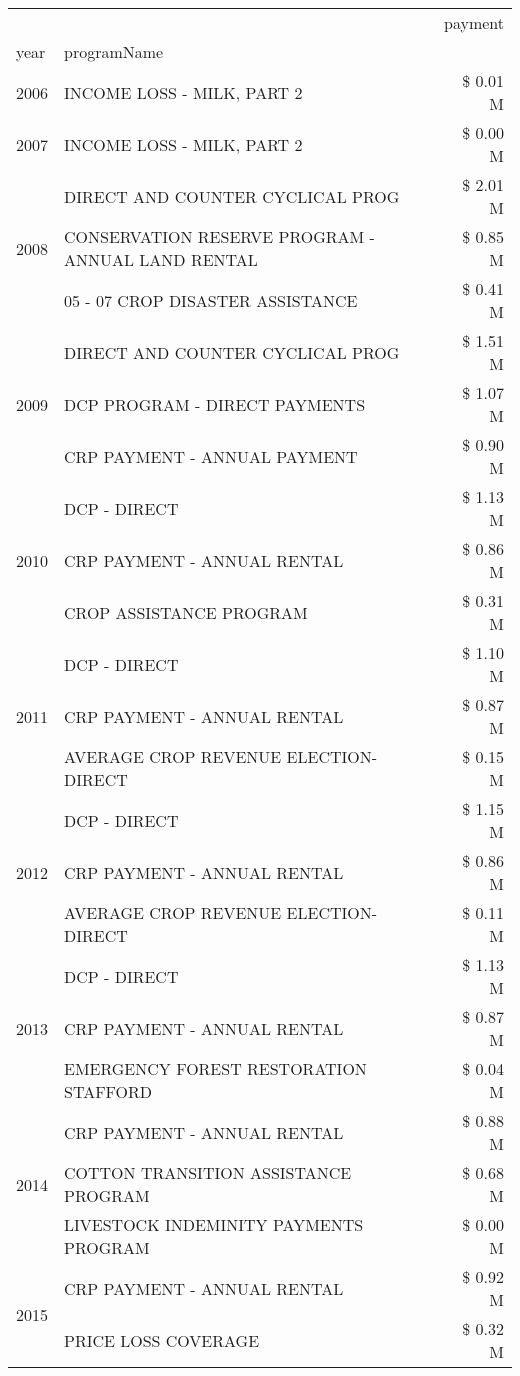 \begin{tabular}{llr}
\toprule
 &  & payment \\
year & programName &  \\
\midrule
2006 & INCOME LOSS - MILK, PART 2 & \$ 0.01 M \\
\cline{1-3}
2007 & INCOME LOSS - MILK, PART 2 & \$ 0.00 M \\
\cline{1-3}
\multirow[t]{3}{*}{2008} & DIRECT AND COUNTER CYCLICAL PROG & \$ 2.01 M \\
 & CONSERVATION RESERVE PROGRAM - ANNUAL LAND RENTAL & \$ 0.85 M \\
 & 05 - 07 CROP DISASTER ASSISTANCE & \$ 0.41 M \\
\cline{1-3}
\multirow[t]{3}{*}{2009} & DIRECT AND COUNTER CYCLICAL PROG & \$ 1.51 M \\
 & DCP PROGRAM - DIRECT PAYMENTS & \$ 1.07 M \\
 & CRP PAYMENT - ANNUAL PAYMENT & \$ 0.90 M \\
\cline{1-3}
\multirow[t]{3}{*}{2010} & DCP - DIRECT & \$ 1.13 M \\
 & CRP PAYMENT - ANNUAL RENTAL & \$ 0.86 M \\
 & CROP ASSISTANCE PROGRAM & \$ 0.31 M \\
\cline{1-3}
\multirow[t]{3}{*}{2011} & DCP - DIRECT & \$ 1.10 M \\
 & CRP PAYMENT - ANNUAL RENTAL & \$ 0.87 M \\
 & AVERAGE CROP REVENUE ELECTION-DIRECT & \$ 0.15 M \\
\cline{1-3}
\multirow[t]{3}{*}{2012} & DCP - DIRECT & \$ 1.15 M \\
 & CRP PAYMENT - ANNUAL RENTAL & \$ 0.86 M \\
 & AVERAGE CROP REVENUE ELECTION-DIRECT & \$ 0.11 M \\
\cline{1-3}
\multirow[t]{3}{*}{2013} & DCP - DIRECT & \$ 1.13 M \\
 & CRP PAYMENT - ANNUAL RENTAL & \$ 0.87 M \\
 & EMERGENCY FOREST RESTORATION STAFFORD & \$ 0.04 M \\
\cline{1-3}
\multirow[t]{3}{*}{2014} & CRP PAYMENT - ANNUAL RENTAL & \$ 0.88 M \\
 & COTTON TRANSITION ASSISTANCE PROGRAM & \$ 0.68 M \\
 & LIVESTOCK INDEMINITY PAYMENTS PROGRAM & \$ 0.00 M \\
\cline{1-3}
\multirow[t]{3}{*}{2015} & CRP PAYMENT - ANNUAL RENTAL & \$ 0.92 M \\
 & PRICE LOSS COVERAGE & \$ 0.32 M \\

\end{tabular}
